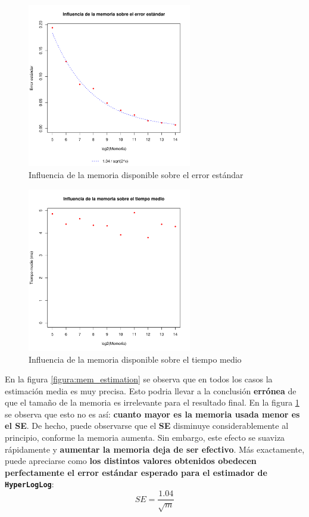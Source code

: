 \begin{figure}[h!]
    \centering
        \includegraphics[width=0.64\textwidth]{../plots/D1/mem_errors_rel.pdf}
        \caption{Influencia de la memoria disponible sobre el error estándar}
    \label{figura:mem_errors}
\end{figure}

\clearpage

\begin{figure}[h!]
    \centering
        \includegraphics[width=0.64\textwidth]{../plots/D1/mem_time_rel.pdf}
        \caption{Influencia de la memoria disponible sobre el tiempo medio}
    \label{figura:mem_time}
\end{figure}

En la figura \ref{figura:mem_estimation} se observa que en todos los casos la estimación media es muy precisa. Esto podria llevar a
la conclusión \textbf{errónea} de que el tamaño de la memoria es irrelevante para el resultado final. En la figura
\ref{figura:mem_errors} se observa que esto no es así: \textbf{cuanto mayor es la memoria usada menor es el \textbf{SE}}.
De hecho, puede observarse que el \textbf{SE} disminuye considerablemente al principio, conforme la memoria aumenta.
Sin embargo,
este efecto se suaviza rápidamente y \textbf{aumentar la memoria deja de ser efectivo}. Más exactamente, puede apreciarse como
\textbf{los distintos valores obtenidos obedecen perfectamente el error estándar esperado para el estimador de
\texttt{HyperLogLog}}:
$$SE = \frac{1.04}{\sqrt{m}}$$

